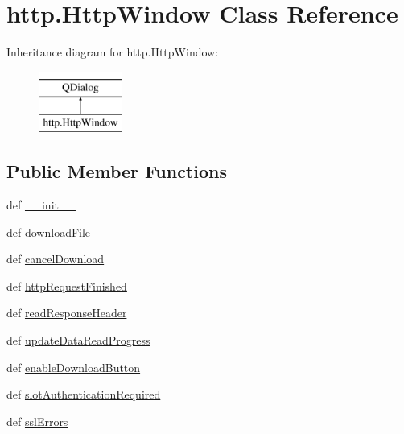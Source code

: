 \hypertarget{classhttp_1_1HttpWindow}{}\section{http.\+Http\+Window Class Reference}
\label{classhttp_1_1HttpWindow}
Inheritance diagram for http.\+Http\+Window\+:\begin{figure}[H]
\begin{center}
\leavevmode
\includegraphics[height=2.000000cm]{classhttp_1_1HttpWindow}
\end{center}
\end{figure}
\subsection*{Public Member Functions}
\begin{DoxyCompactItemize}
\item 
def \hyperlink{classhttp_1_1HttpWindow_aeddb0bb7e061cda800038cf0473f8c01}{\+\_\+\+\_\+init\+\_\+\+\_\+}
\item 
def \hyperlink{classhttp_1_1HttpWindow_a53e720f2ea301e761d0db77117ff18f9}{download\+File}
\item 
def \hyperlink{classhttp_1_1HttpWindow_ae353f241b89adc0f0866ee248b5a0c04}{cancel\+Download}
\item 
def \hyperlink{classhttp_1_1HttpWindow_a17045482cd8853c0b277c0c0cf0e151f}{http\+Request\+Finished}
\item 
def \hyperlink{classhttp_1_1HttpWindow_a0c069c07136329c2128da8db6d8f9496}{read\+Response\+Header}
\item 
def \hyperlink{classhttp_1_1HttpWindow_aa2f64f5d382f1248a7f383207acfe192}{update\+Data\+Read\+Progress}
\item 
def \hyperlink{classhttp_1_1HttpWindow_a23a2a6d27d5ec286d71e71b4e7c640c4}{enable\+Download\+Button}
\item 
def \hyperlink{classhttp_1_1HttpWindow_a143d6847acb5670cf7f4404c95286bfb}{slot\+Authentication\+Required}
\item 
def \hyperlink{classhttp_1_1HttpWindow_a6de4304d21e6ecf3c9447e13dc8a5f58}{ssl\+Errors}
\end{DoxyCompactItemize}
